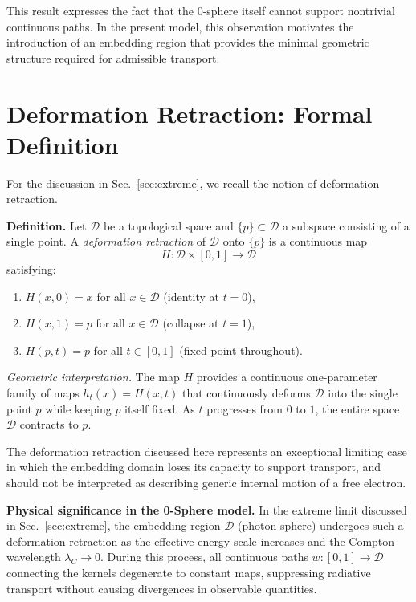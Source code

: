 \documentclass[%
 reprint,
 amsmath,amssymb,
 aps,
 prb,
]{revtex4-2}
\numberwithin{equation}{section}
\begin{document}
\medskip
This result expresses the fact that the 0-sphere itself cannot support nontrivial continuous paths.
In the present model, this observation motivates the introduction of an embedding region that provides the minimal geometric structure required for admissible transport.

\section{Deformation Retraction: Formal Definition}
\label{sec:appendix_deformation}

For the discussion in Sec.~\ref{sec:extreme}, we recall the notion of deformation retraction.

\medskip
\noindent\textbf{Definition.}
Let $\mathcal{D}$ be a topological space and $\{p\} \subset \mathcal{D}$ a subspace consisting of a single point. A \textit{deformation retraction} of $\mathcal{D}$ onto $\{p\}$ is a continuous map
\begin{equation}
H : \mathcal{D} \times [0,1] \to \mathcal{D}
\end{equation}
satisfying:
\begin{enumerate}
\item $H(x,0) = x$ for all $x \in \mathcal{D}$ (identity at $t=0$),
\item $H(x,1) = p$ for all $x \in \mathcal{D}$ (collapse at $t=1$),
\item $H(p,t) = p$ for all $t \in [0,1]$ (fixed point throughout).
\end{enumerate}



\medskip
\noindent\textit{Geometric interpretation.}
The map $H$ provides a continuous one-parameter family of maps $h_t(x) = H(x,t)$ that continuously deforms $\mathcal{D}$ into the single point $p$ while keeping $p$ itself fixed. As $t$ progresses from $0$ to $1$, the entire space $\mathcal{D}$ contracts to $p$.

The deformation retraction discussed here represents an exceptional limiting case in which the embedding domain loses its capacity to support transport, and should not be interpreted as describing generic internal motion of a free electron.


\medskip
\noindent\textbf{Physical significance in the 0-Sphere model.}
In the extreme limit discussed in Sec.~\ref{sec:extreme}, the embedding region $\mathcal{D}$ (photon sphere) undergoes such a deformation retraction as the effective energy scale increases and the Compton wavelength $\lambda_C \to 0$. During this process, all continuous paths $w : [0,1] \to \mathcal{D}$ connecting the kernels degenerate to constant maps, suppressing radiative transport without causing divergences in observable quantities.
\end{document}
